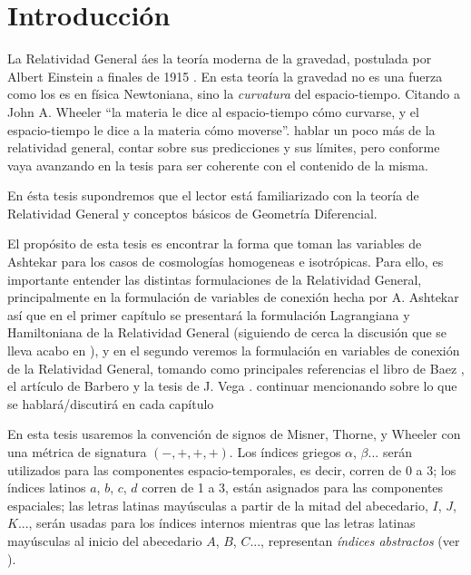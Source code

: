 \documentclass[10pt, letterpaper, spanish]{book}
\theoremstyle{definition}
\theoremstyle{plain}
\theoremstyle{remark}
\theoremstyle{break}
\begin{document}
\printnomenclature
\tableofcontents{}




\chapter*{Introducci\'{o}n}

La Relatividad General \'{a}es la teor\'{i}a moderna de la gravedad, postulada por Albert Einstein a finales de 1915 \cite{Einstein}. En esta teor\'{i}a la gravedad no es una fuerza como los es en f\'{i}sica Newtoniana, sino la \emph{curvatura} del espacio-tiempo. Citando a John A. Wheeler ``la materia le dice al espacio-tiempo c\'{o}mo curvarse, y el espacio-tiempo le dice a la materia c\'{o}mo moverse''. {\color{OliveGreen} hablar un poco m\'{a}s de la relatividad general, contar sobre sus predicciones y sus l\'{i}mites, pero conforme vaya avanzando en la tesis para ser coherente con el contenido de la misma.}

En \'{e}sta tesis supondremos que el lector est\'{a} familiarizado con la teor\'{i}a de Relatividad General y conceptos b\'{a}sicos de Geometr\'{i}a Diferencial.

El prop\'{o}sito de esta tesis es encontrar la forma que toman las variables de Ashtekar para los casos de cosmolog\'{i}as homogeneas e isotr\'{o}picas. Para ello, es importante entender las distintas formulaciones de la Relatividad General, principalmente en la formulaci\'{o}n de variables de conexi\'{o}n hecha por A. Ashtekar \cite{Ashtekar86, Ashtekar87} as\'{i} que en el primer cap\'{i}tulo se presentar\'{a} la formulaci\'{o}n Lagrangiana y Hamiltoniana de la Relatividad General (siguiendo de cerca la discusi\'{o}n que se lleva acabo en \cite{Poisson}), y en el segundo veremos la formulaci\'{o}n en variables de conexi\'{o}n de la Relatividad General, tomando como principales referencias el libro de Baez \cite{Baez}, el art\'{i}culo de Barbero \cite{Barbero} y la tesis de J. Vega \cite{Vega}. {\color{OliveGreen}continuar mencionando sobre lo que se hablar\'{a}/discutir\'{a} en cada cap\'{i}tulo}

En esta tesis usaremos la convenci\'{o}n de signos de Misner, Thorne, y Wheeler con una m\'{e}trica de signatura $(-,+,+,+)$. Los \'{i}ndices griegos $\alpha$, $\beta...$ ser\'{a}n utilizados para las componentes espacio-temporales, es decir, corren de 0 a 3; los \'{i}ndices latinos $a$, $b$, $c$, $d$ corren de 1 a 3, est\'{a}n asignados para las componentes espaciales; las letras latinas may\'{u}sculas a partir de la mitad del abecedario, $I$, $J$, $K$..., ser\'{a}n usadas para los \'{i}ndices internos mientras que las letras latinas may\'{u}sculas al inicio del abecedario $A$, $B$, $C$..., representan \emph{\'{i}ndices abstractos} (ver \cite{Wald}).
\end{document}
